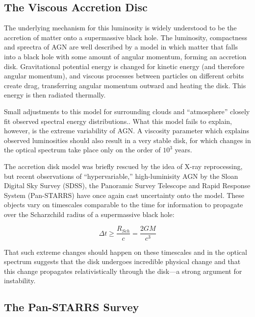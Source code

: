 \documentclass[a4paper,11pt]{article}
\begin{document}
\subsection{The Viscous Accretion Disc}\label{sec:viscous_accretion_disk}

The underlying mechanism for this luminosity is widely understood to be the accretion of matter onto a supermassive black hole.\cite{mcclure_2019} The luminosity, compactness and sprectra of AGN are well described by a model in which matter that falls into a black hole with some amount of angular momentum, forming an accretion disk. Gravitational potential energy is changed for kinetic energy (and therefore angular momentum), and viscous processes between particles on different orbits create drag, transferring angular momentum outward and heating the disk. This energy is then radiated thermally.\cite{lawrence_2018}

Small adjustments to this model for surrounding clouds and ``atmosphere'' closely fit observed spectral energy distributions.\cite{lawrence_2018}. What this model fails to explain, however, is the extreme variability of AGN. A viscosity parameter which explains observed luminosities should also result in a very stable disk, for which changes in the optical spectrum take place only on the order of $10^3$ years.\cite{lawrence_2018}

The accretion disk model was briefly rescued by the idea of X-ray reprocessing, but recent observations of ``hypervariable,'' high-luminisity AGN by the Sloan Digital Sky Survey (SDSS), the Panoramic Survey Telescope and Rapid Response System (Pan-STARRS) have once again cast uncertainty onto the model.\cite{lawrence_2018} These objects vary on timescales comparable to the time for information to propagate over the Scharzchild radius of a supermassive black hole\cite{mcclure_2019}\cite{lawrence_2018}:

\begin{equation}
    \Delta t \geq \frac{R_{Sch}}{c} = \frac{2GM}{c^3}
\end{equation}

\noindent That such extreme changes should happen on these timescales and in the optical spectrum suggests that the disk undergoes incredible physical change and that this change propagates relativistically through the disk---a strong argument for instability.

\subsection{The Pan-STARRS Survey}\label{sec:panstarrs_survey}
\end{document}
